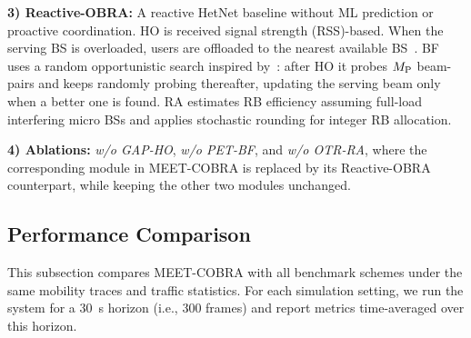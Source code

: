 \documentclass[conference, a4paper]{IEEEtran}
\theoremstyle{remark}
\begin{document}
\textbf{3) Reactive-OBRA:} A reactive HetNet baseline without ML prediction or proactive coordination. HO is received signal strength (RSS)-based. When the serving BS is overloaded, users are offloaded to the nearest available BS~\cite{Alexandris2016LoadAwareHO}. BF uses a random opportunistic search inspired by~\cite{Aykin2020}: after HO it probes $M_{\rm P}$ beam-pairs and keeps randomly probing thereafter, updating the serving beam only when a better one is found. RA estimates RB efficiency assuming full-load interfering micro BSs and applies stochastic rounding for integer RB allocation.


\textbf{4) Ablations:} \emph{w/o GAP-HO}, \emph{w/o PET-BF}, and \emph{w/o OTR-RA}, where the corresponding module in MEET-COBRA is replaced by its Reactive-OBRA counterpart, while keeping the other two modules unchanged.

\subsection{Performance Comparison}

This subsection compares MEET-COBRA with all benchmark schemes under the same mobility traces and traffic statistics. For each simulation setting, we run the system for a $30$~s horizon (i.e., $300$ frames) and report metrics time-averaged over this horizon.
\end{document}
